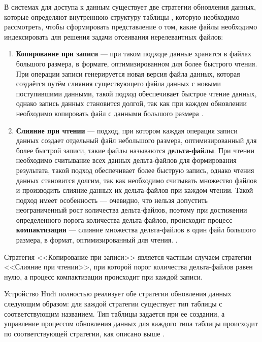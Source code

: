 В системах для доступа к данным существует две стратегии обновления данных, которые определяют внутреннюю структуру таблицы \cite{Analyzing_and_comparing_lakehouse_storage_systems}, которую необходимо рассмотреть, чтобы сформировать представление о том, какие файлы необходимо индексировать для решения задачи отсеивания нерелевантных файлов: 
\begin{enumerate}
    \item \textbf{Копирование при записи} --- при таком подходе данные хранятся в файлах большого размера, в формате, оптимизированном для более быстрого чтения. При операции записи генерируется новая версия файла данных, которая создаётся путём слияния существующего файла данных с новыми поступившими данными, такой подход обеспечивает быстрое чтение данных, однако запись данных становится долгой, так как при каждом обновлении необходимо копировать файл с данными большого размера \cite{Analyzing_and_comparing_lakehouse_storage_systems}.
    \item \textbf{Слияние при чтении} --- подход, при котором каждая операция записи данных создает отдельный файл небольшого размера, оптимизированный для более быстрой записи, такие файлы называются \textbf{дельта-файлы}. При чтении необходимо считывание всех данных дельта-файлов для формирования результата, такой подход обеспечивает более быструю запись, однако чтения данных становится долгим, так как необходимо считывать множество файлов и производить слияние данных их дельта-файлов при каждом чтении. Такой подход имеет особенность --- очевидно, что нельзя допустить неограниченный рост количества дельта-файлов, поэтому при достижении определенного порога количества дельта-файлов, происходит процесс \textbf{компактизации} --- слияние множества дельта-файлов в один файл большого размера, в формат, оптимизированный для чтения. \cite{Analyzing_and_comparing_lakehouse_storage_systems}. 
\end{enumerate}
Стратегия {<<Копирование при записи>>} является частным случаем стратегии {<<Слияние при чтении>>}, при которой порог количества дельта-файлов равен нулю, а процесс компактизации происходит при каждой записи.

Устройство Hudi полностью реализует обе стратегии обновления данных следующим образом: для каждой стратегии существует тип таблицы с соответствующим названием. Тип таблицы задается при ее создании, а управление процессом обновления данных для каждого типа таблицы происходит по соответствующей стратегии, как описано выше \cite{Hudi_Table_types}.

